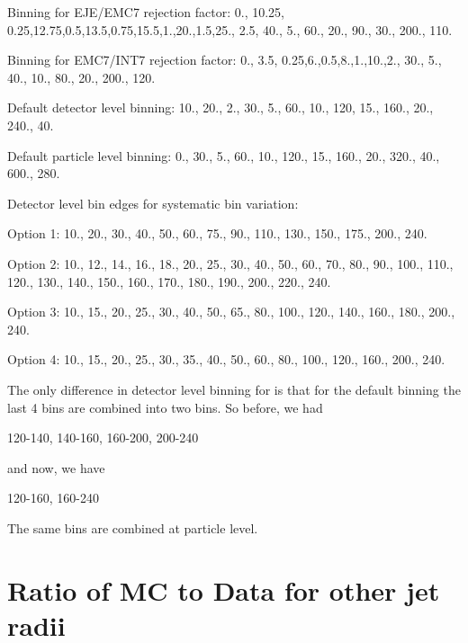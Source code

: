 Binning for EJE/EMC7 rejection factor:
0., {{10.25, 0.25},{12.75,0.5},{13.5,0.75},{15.5,1.},{20.,1.5},{25., 2.5}, {40., 5.}, {60., 20.}, {90., 30.}, {200., 110.}}

\bigskip

Binning for EMC7/INT7 rejection factor:
0., {{3.5, 0.25},{6.,0.5},{8.,1.},{10.,2.}, {30., 5.}, {40., 10.}, {80., 20.}, {200., 120.}}

\bigskip

Default detector level binning:
10., {{20., 2.}, {30., 5.}, {60., 10.}, {120, 15.}, {160., 20.}, {240., 40.}}

\bigskip

Default particle level binning:
0., {{30., 5.}, {60., 10.}, {120., 15.}, {160., 20.}, {320., 40.}, {600., 280.}}

\bigskip

Detector level bin edges for systematic bin variation:

\bigskip

Option 1:
10., 20., 30., 40., 50., 60., 75., 90., 110., 130., 150., 175., 200., 240.

\bigskip

Option 2:
10., 12., 14., 16., 18., 20., 25., 30., 40., 50., 60., 70., 80., 90., 100., 110., 120., 130., 140., 150., 160., 170., 180., 190., 200., 220., 240.

\bigskip

Option 3:
10., 15., 20., 25., 30., 40., 50., 65., 80., 100., 120., 140., 160., 180., 200., 240.

\bigskip

Option 4:
10., 15., 20., 25., 30., 35., 40., 50., 60., 80., 100., 120., 160., 200., 240.

The only difference in detector level binning for \pPb is that for the default binning the last 4 bins are combined into two bins. So before, we had

120-140, 140-160, 160-200, 200-240

and now, we have

120-160, 160-240

The same bins are combined at particle level.

\newpage

\section{Ratio of MC to Data for other jet radii}
\label{sec:appendixRatioSimData}

